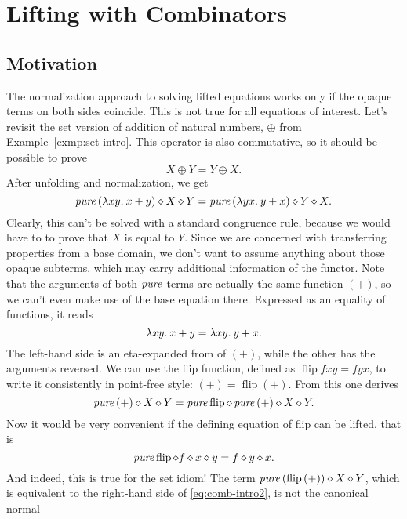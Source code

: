 \section{Lifting with Combinators}\label{sec:combinators}

\subsection{Motivation}\label{subsec:combinator-motivation}

The normalization approach to solving lifted equations works only if the
opaque terms on both sides coincide.
This is not true for all equations of interest.
Let's revisit the set version of addition of natural numbers, $\oplus$ from
Example~\ref{exmp:set-intro}.
This operator is also commutative, so it should be possible to prove
\[ X \oplus Y = Y \oplus X. \]
After unfolding and normalization, we get
\begin{equation}\label{eq:comb-intro1}
	\operatorname{\mathit{pure}}{(\lambda xy.\>x + y)} \diamond X \diamond Y = \operatorname{\mathit{pure}}{(\lambda yx.\>y + x)} \diamond Y \diamond X.
\end{equation}
Clearly, this can't be solved with a standard congruence rule, because we would
have to to prove that $X$ is equal to $Y$.
Since we are concerned with transferring properties from a base domain,
we don't want to assume anything about those opaque subterms, which may
carry additional information of the functor.
Note that the arguments of both $\operatorname{\mathit{pure}}$ terms are actually the same function
$(+)$, so we can't even make use of the base equation there.
Expressed as an equality of functions, it reads
\[ \lambda xy.\>x + y = \lambda xy.\>y + x. \]
The left-hand side is an eta-expanded from of $(+)$, while the other has the
arguments reversed.
We can use the flip function, defined as $\operatorname{flip} fxy = fyx$,
to write it consistently in point-free style: $(+) = \operatorname{flip}{(+)}$.
From this one derives
\begin{equation}\label{eq:comb-intro2}
	\operatorname{\mathit{pure}}{(+)} \diamond X \diamond Y = \operatorname{\mathit{pure}} \operatorname{flip} \diamond \operatorname{\mathit{pure}}{(+)} \diamond X \diamond Y.
\end{equation}
Now it would be very convenient if the defining equation of flip can be lifted,
that is
\begin{equation}\label{eq:flip-lifted}
	\operatorname{\mathit{pure}} \operatorname{flip} \diamond f \diamond x \diamond y = f \diamond y \diamond x.
\end{equation}
And indeed, this is true for the set idiom!
The term $\operatorname{\mathit{pure}}{(\operatorname{flip}{(+)})} \diamond X \diamond Y$, which is equivalent
to the right-hand side of \eqref{eq:comb-intro2}, is not the canonical normal
